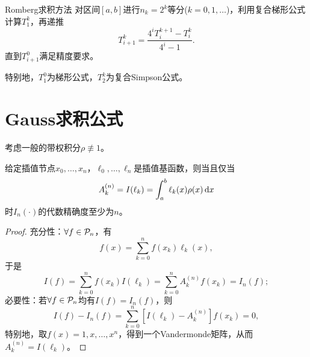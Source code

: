 \begin{theorem}
    {Romberg求积方法}{}
    对区间$[a,b]$进行$n_k=2^k$等分($k=0,1,\ldots$)，利用复合梯形公式计算$T_1^k$，再递推
    \begin{equation}
        T_{i+1}^k=\frac{4^iT_i^{k+1}-T_i^k}{4^i-1}.
    \end{equation}
    直到$T_{i+1}^0$满足精度要求。
\end{theorem}

特别地，$T_1^0$为梯形公式，$T_2^k$为复合Simpson公式。




\section{Gauss求积公式}
\label{sec:Gauss-type quadrature rules}

考虑一般的带权积分$\rho\not\equiv 1$。

\begin{theorem}
    {}{}
    给定插值节点$x_0,\ldots,x_n$，$\ell_0,\ldots,\ell_n$是插值基函数，则当且仅当
    \[
        A_k^{(n)}=I(\ell_k)=\int_a^b\ell_k(x)\rho(x)\mathop{}\!\mathrm{d} x
    \]
    时$I_n(\cdot)$的代数精确度至少为$n$。
\end{theorem}

\begin{proof}
    充分性：$\forall f\in\mathcal P_n$，有 
    \[
        f(x)=\sum_{k=0}^nf(x_k)\ell_k(x),
    \]
    于是
    \[
        I(f)=\sum_{k=0}^nf(x_k)I(\ell_k)=\sum_{k=0}^nA_k^{(n)}f(x_k)=I_n(f);
    \]
    必要性：若$\forall f\in\mathcal P_n$均有$I(f)=I_n(f)$，则
    \[
        I(f)-I_n(f)=\sum_{k=0}^n[I(\ell_k)-A_k^{(n)}]f(x_k)=0,
    \]
    特别地，取$f(x)=1,x,\ldots,x^n$，得到一个Vandermonde矩阵，从而$A_k^{(n)}=I(\ell_k)$。
\end{proof}

